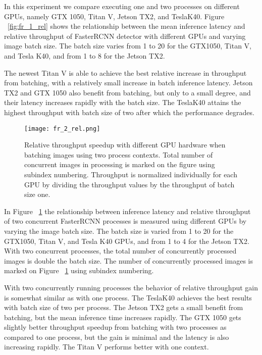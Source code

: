 \documentclass[sigconf]{acmart}
\begin{document}
In this experiment we compare executing one and two processes on different GPUs, namely GTX 1050, Titan V, Jetson TX2, and TeslaK40. Figure ~\ref{fig:fr_1_rel} shows the relationship between the mean inference latency and relative throughput of FasterRCNN detector with different GPUs and varying image batch size. The batch size varies from 1 to 20 for the GTX1050, Titan V, and Tesla K40, and from 1 to 8 for the Jetson TX2.

The newest Titan V is able to achieve the best relative increase in throughput from batching, with a relatively small increase in batch inference latency. Jetson TX2 and GTX 1050 also benefit from batching, but only to a small degree, and their latency increases rapidly with the batch size. The TeslaK40 attains the highest throughput with batch size of two after which the performance degrades.

\begin{figure}[t]
\centering
\texttt{[image: fr\_2\_rel.png]}
\caption{Relative throughput speedup with different GPU hardware when batching images using two process contexts. Total number of concurrent images in processing is marked on the figure using subindex numbering. Throughput is normalized individually for each GPU by dividing the throughput values by the throughput of batch size one.}
\label{fig:fr_2_rel}
\end{figure}

In Figure ~\ref{fig:fr_2_rel} the relationship between inference latency and relative throughput of two concurrent FasterRCNN processes is measured using different GPUs by varying the image batch size. The batch size is varied from 1 to 20 for the GTX1050, Titan V, and Tesla K40 GPUs, and from 1 to 4 for the Jetson TX2. With two concurrent processes, the total number of concurrently processed images is double the batch size. The number of concurrently processed images is marked on Figure ~\ref{fig:fr_2_rel} using subindex numbering.

With two concurrently running processes the behavior of relative throughput gain is somewhat similar as with one process. The TeslaK40 achieves the best results with batch size of two per process. The Jetson TX2 gets a small benefit from batching, but the mean inference time increases rapidly. The GTX 1050 gets slightly better throughput speedup from batching with two processes as compared to one process, but the gain is minimal and the latency is also increasing rapidly. The Titan V performs better with one context.
\end{document}
